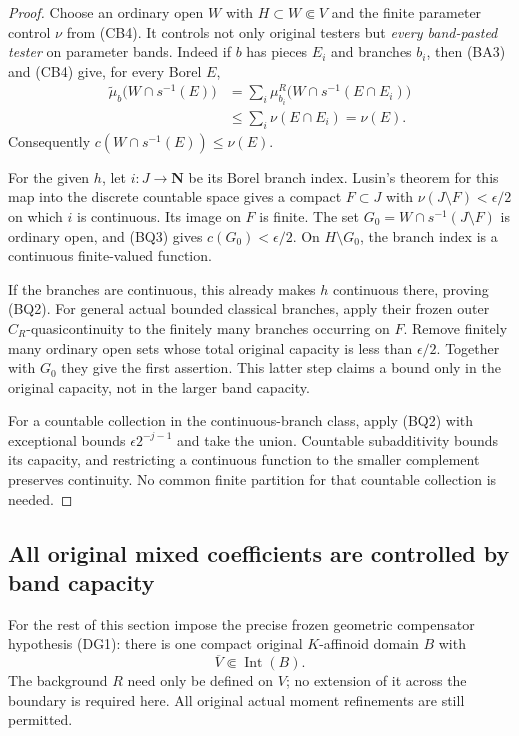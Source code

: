 \documentclass[11pt,a4paper]{article}
\numberwithin{equation}{section}
\theoremstyle{definition}
\theoremstyle{remark}
\begin{document}
\begin{proof}
Choose an ordinary open $W$ with $H\subset W\Subset V$ and
the finite parameter control $\nu$ from (CB4). It controls not
only original testers but \emph{every band-pasted tester} on
parameter bands. Indeed if $b$ has pieces $E_i$ and branches
$b_i$, then (BA3) and (CB4) give, for every Borel $E$,
\[
 \begin{split}
 \widetilde\mu_b\bigl(W\cap s^{-1}(E)\bigr)
 &=\sum_i\mu^R_{b_i}\bigl(W\cap s^{-1}(E\cap E_i)\bigr)\\
 &\leq\sum_i\nu(E\cap E_i)=\nu(E).
 \end{split}
 \tag{BQ3}
\]
Consequently $c(W\cap s^{-1}(E))\leq\nu(E)$.

For the given $h$, let $i:J\to\mathbf N$ be its Borel branch
index. Lusin's theorem for this map into the discrete countable
space gives a compact $F\subset J$ with
$\nu(J\setminus F)<\epsilon/2$ on which $i$ is continuous.
Its image on $F$ is finite. The set
$G_0=W\cap s^{-1}(J\setminus F)$ is ordinary open, and
(BQ3) gives $c(G_0)<\epsilon/2$. On
$H\setminus G_0$, the branch index is a continuous
finite-valued function.

If the branches are continuous, this already makes $h$ continuous
there, proving (BQ2). For general actual bounded classical
branches, apply their frozen outer $C_R$-quasicontinuity to the
finitely many branches occurring on $F$. Remove finitely many
ordinary open sets whose total original capacity is less than
$\epsilon/2$. Together with $G_0$ they give the first assertion.
This latter step claims a bound only in the original capacity,
not in the larger band capacity.

For a countable collection in the continuous-branch class, apply
(BQ2) with exceptional bounds $\epsilon2^{-j-1}$ and take the
union. Countable subadditivity bounds its capacity, and restricting
a continuous function to the smaller complement preserves
continuity. No common finite partition for that countable
collection is needed.
\end{proof}

\subsection{All original mixed coefficients are controlled by band capacity}

For the rest of this section impose the precise frozen geometric
compensator hypothesis (DG1): there is one compact original
$K$-affinoid domain $B$ with
\[
                         \overline V\Subset\operatorname{Int}(B).
 \tag{BQ4}
\]
The background $R$ need only be defined on $V$; no extension of
it across the boundary is required here. All original actual
moment refinements are still permitted.
\end{document}
